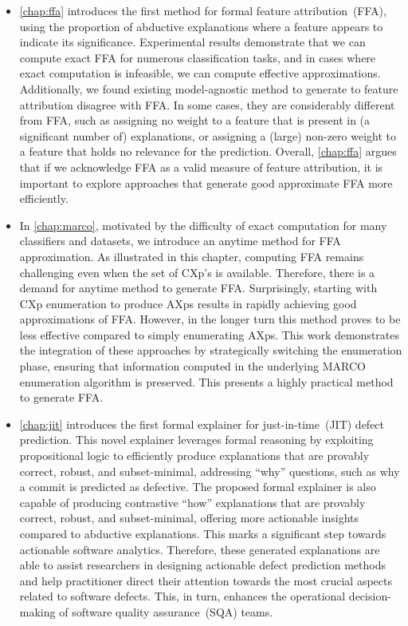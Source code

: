 \begin{itemize}
	\item \autoref{chap:ffa}  introduces the first method for formal feature attribution~(FFA),
		using the proportion of abductive explanations where a feature appears to
		indicate its significance.
		Experimental results demonstrate that we can compute exact FFA for numerous classification tasks, 
		and in cases where exact computation is infeasible, we can compute effective approximations.
		Additionally, we found existing model-agnostic method to generate to feature attribution 
		disagree with FFA.
		In some cases, they are considerably different from FFA, such as assigning no weight to 
		a feature that is present in (a significant number of) explanations,
		or assigning a (large) non-zero weight to a feature that holds no relevance for the prediction.
		Overall, \autoref{chap:ffa} argues that if we acknowledge FFA as a valid measure 
		of feature attribution, it is important to explore approaches that generate good 
		approximate FFA more efficiently.

	\item In \autoref{chap:marco}, motivated by the difficulty of exact computation for 
		many classifiers and datasets, we introduce an anytime method for FFA
		approximation.
		As illustrated in this chapter, computing FFA remains challenging even 
		when the set of CXp's is available. 
		Therefore, there is a demand for anytime method to generate FFA.
		Surprisingly, starting with CXp enumeration to produce AXps results in 
		rapidly achieving good approximations of FFA.
		However, in the longer turn this method proves to be less effective 
		compared to simply enumerating AXps.
		This work demonstrates the integration of these approaches by strategically 
		switching the enumeration phase, ensuring that information computed in the 
		underlying MARCO enumeration algorithm is preserved.
		This presents a highly practical method to generate  FFA.

	\item \autoref{chap:jit} introduces the first formal explainer for just-in-time~(JIT) 
		defect prediction. 
		This novel explainer leverages formal reasoning by exploiting propositional logic
		to efficiently produce explanations that are provably correct, robust, 
		and subset-minimal, addressing ``why'' questions, such as why a commit is 
		predicted as defective.
		The proposed formal explainer is also capable of producing contrastive ``how'' 
		explanations that are provably correct, robust, and subset-minimal, 
		offering more actionable insights compared to abductive explanations.
		This marks a significant step towards actionable software analytics.
		Therefore, these generated explanations are able to assist researchers 
		in designing actionable defect prediction methods and help practitioner direct their
		attention towards the most crucial aspects related to software defects. 
		This, in turn, enhances the operational decision-making of software quality assurance~(SQA) teams.
\end{itemize}

